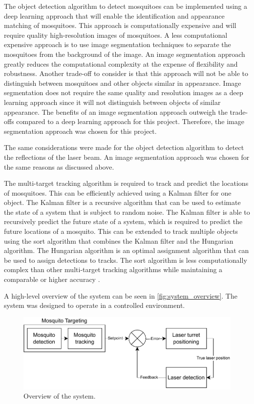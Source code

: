 The object detection algorithm to detect mosquitoes can be implemented using a deep learning approach that will enable the identification and appearance matching of mosquitoes. This approach is computationally expensive and will require quality high-resolution images of mosquitoes. A less computational expensive approach is to use image segmentation techniques to separate the mosquitoes from the background of the image. An image segmentation approach greatly reduces the computational complexity at the expense of flexibility and robustness. Another trade-off to consider is that this approach will not be able to distinguish between mosquitoes and other objects similar in appearance. Image segmentation does not require the same quality and resolution images as a deep learning approach since it will not distinguish between objects of similar appearance. The benefits of an image segmentation approach outweigh the trade-offs compared to a deep learning approach for this project. Therefore, the image segmentation approach was chosen for this project.

The same considerations were made for the object detection algorithm to detect the reflections of the laser beam. An image segmentation approach was chosen for the same reasons as discussed above.

The multi-target tracking algorithm is required to track and predict the locations of mosquitoes. This can be efficiently achieved using a Kalman filter for one object. The Kalman filter is a recursive algorithm that can be used to estimate the state of a system that is subject to random noise. The Kalman filter is able to recursively predict the future state of a system, which is required to predict the future locations of a mosquito. This can be extended to track multiple objects using the \gls{sort} algorithm that combines the Kalman filter and the Hungarian algorithm. The Hungarian algorithm is an optimal assignment algorithm that can be used to assign detections to tracks. The \gls{sort} algorithm is less computationally complex than other multi-target tracking algorithms while maintaining a comparable or higher accuracy \cite{SORT-Bewley2017}.

A high-level overview of the system can be seen in \autoref{fig:system_overview}. The system was designed to operate in a controlled environment.
\begin{figure}[!htb]
      \centering
      \includegraphics[width=1\textwidth]{figures/system_overview.pdf}
      \caption{Overview of the system.}
      \label{fig:system_overview}
\end{figure}

\newpage


